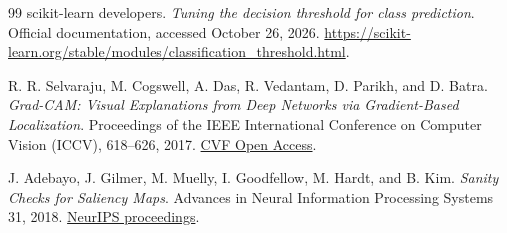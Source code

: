 \documentclass[12pt,letterpaper]{article}
\begin{document}
\begin{thebibliography}{99}
scikit-learn developers.
\textit{Tuning the decision threshold for class prediction}.
Official documentation, accessed October 26, 2026.
\url{https://scikit-learn.org/stable/modules/classification_threshold.html}.

R. R. Selvaraju, M. Cogswell, A. Das, R. Vedantam, D. Parikh, and D. Batra.
\textit{Grad-CAM: Visual Explanations from Deep Networks via Gradient-Based Localization}.
Proceedings of the IEEE International Conference on Computer Vision (ICCV), 618--626, 2017.
\href{https://openaccess.thecvf.com/content_ICCV_2017/papers/Selvaraju_Grad-CAM_Visual_Explanations_ICCV_2017_paper.pdf}{CVF Open Access}.

J. Adebayo, J. Gilmer, M. Muelly, I. Goodfellow, M. Hardt, and B. Kim.
\textit{Sanity Checks for Saliency Maps}.
Advances in Neural Information Processing Systems 31, 2018.
\href{https://proceedings.neurips.cc/paper/2018/hash/294a8ed24b1ad22ec2e7efea049b8737-Abstract.html}{NeurIPS proceedings}.

\end{thebibliography}
\end{document}
